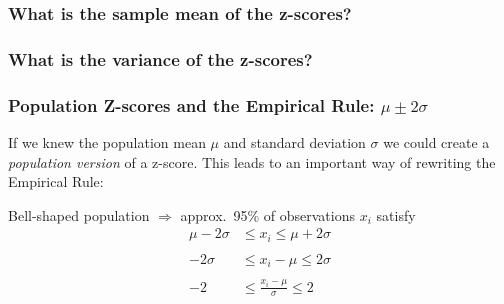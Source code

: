 \documentclass{beamer}
\begin{document}
\begin{frame}
\frametitle{What is the sample mean of the z-scores?}
\end{frame}

\begin{frame}
\frametitle{What is the variance of the z-scores?}
\end{frame}

\begin{frame}
\frametitle{Population Z-scores and the Empirical Rule: $\mu \pm 2\sigma$}
	If we knew the population mean $\mu$ and standard deviation $\sigma$ we could create a 			\alert{\emph{population version}} of a z-score. This leads to an important way of rewriting the 		Empirical Rule:

	\alert{Bell-shaped population $\Rightarrow$ approx.\ 95\% of observations $x_i$ satisfy}
	\begin{align*}
	\mu - 2\sigma &\leq x_i \leq \mu + 2\sigma
	\\
	\\
	-2 \sigma &\leq x_i -\mu \leq 2\sigma
	\\
	\\
	-2 &\leq \frac{x_i - \mu}{\sigma} \leq 2
	\end{align*}
\end{frame}
\end{document}

